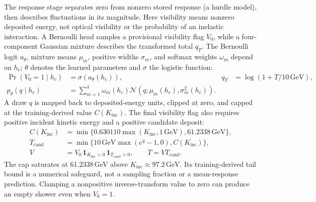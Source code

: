 \documentclass[11pt]{article}
\newcommand{\GeV}{\,\mathrm{GeV}}
\newcommand{\Kinc}{K_{\mathrm{inc}}}
\begin{document}
The response stage separates zero from nonzero stored response (a hurdle model), then describes fluctuations in its magnitude. Here visibility means nonzero deposited energy, not optical visibility or the probability of an inelastic interaction. A Bernoulli head samples a provisional visibility flag $V_0$, while a four-component Gaussian mixture describes the transformed total $q_T$. The Bernoulli logit $a_\theta$, mixture means $\mu_m$, positive widths $\sigma_m$, and softmax weights $\omega_m$ depend on $h_c$; $\theta$ denotes the learned parameters and $\sigma$ the logistic function:
\begin{equation}
 \begin{aligned}
 \Pr(V_0=1\mid h_c)&=\sigma(a_\theta(h_c)),
 &q_T&=\log(1+T/10\GeV),\\
 p_\theta(q\mid h_c)&=\sum_{m=1}^{4}\omega_m(h_c)
 \mathcal N\!\left(q;\mu_m(h_c),\sigma_m^2(h_c)\right).
 \end{aligned}
 \label{eq:response_transform}
\end{equation}
A draw $q$ is mapped back to deposited-energy units, clipped at zero, and capped at the training-derived value $C(\Kinc)$. The final visibility flag also requires positive incident kinetic energy and a positive candidate deposit:
\begin{equation}
 \begin{aligned}
 C(\Kinc)&=\min\{0.630110\max(\Kinc,1\GeV),61.2338\GeV\},\\
 T_{\mathrm{cand}}&=\min\{10\GeV\max(e^q-1,0),C(\Kinc)\},\\
 V&=V_0\,\mathbf 1_{\Kinc>0}\,\mathbf 1_{T_{\mathrm{cand}}>0},
 \qquad T=VT_{\mathrm{cand}}.
 \end{aligned}
 \label{eq:cap}
\end{equation}
The cap saturates at 61.2338\,GeV above $\Kinc\approx97.2\GeV$. Its training-derived tail bound is a numerical safeguard, not a sampling fraction or a mean-response prediction. Clamping a nonpositive inverse-transform value to zero can produce an empty shower even when $V_0=1$.
\end{document}
